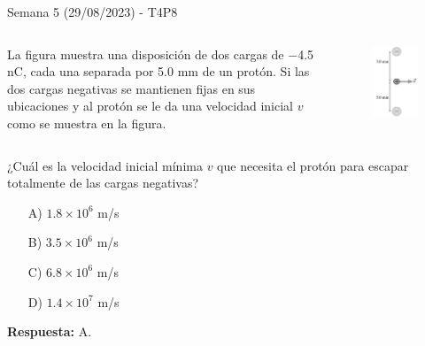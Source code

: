 \begin{frame}{Semana 5 (29/08/2023) - T4P8}

        \begin{columns}
        La figura muestra una disposición de dos cargas de $-$4.5 nC, cada una separada por 5.0 mm de un protón. Si las dos cargas negativas se mantienen fijas en sus ubicaciones y al protón se le da una velocidad inicial $v$ como se muestra en la figura.
        \begin{figure}
        \centering
        \includegraphics[scale=0.3]{figures/t4p7.png}
        \end{figure}
        \end{columns}
        
        \vspace{1em}
        
        ¿Cuál es la velocidad inicial mínima $v$ que necesita el protón para escapar totalmente de las cargas negativas?
        
        \begin{itemize}
        \item[A)] $1.8 \times 10^6$ m/s
        \item[B)] $3.5 \times 10^6$ m/s
        \item[C)] $6.8 \times 10^6$ m/s
        \item[D)] $1.4 \times 10^7$ m/s
        \end{itemize}
        
        \pause \centering \textbf{Respuesta:} A.
        
    \end{frame}

